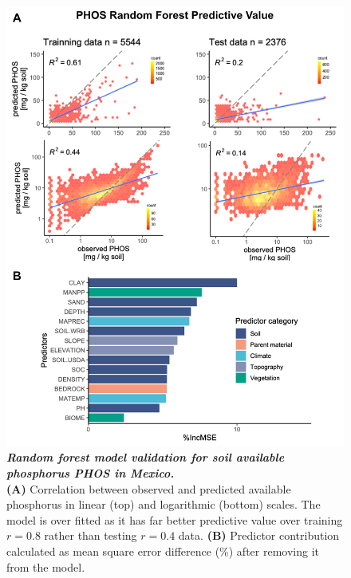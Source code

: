 \begin{figure}[!ht]
\centering
\includegraphics[width=\linewidth]{Chapter-2/figs/rf_validation.png}
\caption[Random forest model validation for soil  available phosphorus PHOS in Mexico]{\textit{\textbf{Random forest model validation for soil  available phosphorus PHOS in Mexico.}} \\\hspace{\textwidth} 
\textbf{(A)} Correlation between observed and predicted available phosphorus in linear (top) and logarithmic (bottom) scales.
The model is over fitted as it has far better predictive value over training $r=0.8$ rather than testing $r=0.4$ data.
\textbf{(B)} Predictor contribution calculated as mean square error difference (\%) after removing it from the model.}
\label{fig::rfvalidation}
\end{figure}
\clearpage



